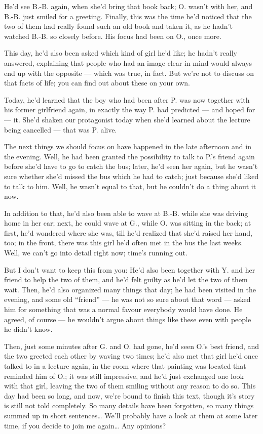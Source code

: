 He'd see B.-B. again, when she'd bring that book back; O. wasn't with her, and B.-B. just smiled for a greeting. Finally, this was the time he'd noticed that the two of them had really found such an old book and taken it, as he hadn't watched B.-B. so closely before. His focus had been on O., once more.

This day, he'd also been asked which kind of girl he'd like; he hadn't really answered, explaining that people who had an image clear in mind would always end up with the opposite --- which was true, in fact.
But we're not to discuss on that facts of life; you can find out about these on your own.

Today, he'd learned that the boy who had been after P. was now together with his former girlfriend again, in exactly the way P. had predicted --- and hoped for --- it. She'd shaken our protagonist today when she'd learned about the lecture being cancelled --- that was P. alive.

The next things we should focus on have happened in the late afternoon and in the evening. Well, he had been granted the possibility to talk to P.'s friend again before she'd have to go to catch the bus; later, he'd seen her again, but he wasn't sure whether she'd missed the bus which he had to catch; just because she'd liked to talk to him. Well, he wasn't equal to that, but he couldn't do a thing about it now.

In addition to that, he'd also been able to wave at B.-B. while she was driving home in her car; next, he could wave at G., while O. was sitting in the back; at first, he'd wondered where she was, till he'd realized that she'd raised her hand, too; in the front, there was this girl he'd often met in the bus the last weeks.
Well, we can't go into detail right now; time's running out.

But I don't want to keep this from you: He'd also been together with Y. and her friend to help the two of them, and he'd felt guilty as he'd let the two of them wait. Then, he'd also organized many things that day; he had been visited in the evening, and some old \enquote{friend} --- he was not so sure about that word --- asked him for something that was a normal favour everybody would have done. He agreed, of course --- he wouldn't argue about things like these even with people he didn't know.

Then, just some minutes after G. and O. had gone, he'd seen O.'s best friend, and the two greeted each other by waving two times; he'd also met that girl he'd once talked to in a lecture again, in the room where that painting was located that reminded him of O.; it was still impressive, and he'd just exchanged one look with that girl, leaving the two of them smiling without any reason to do so. 
This day had been so long, and now, we're bound to finish this text, though it's story is still not told completely. So many details have been forgotten, so many things summed up in short sentences\ldots
We'll probably have a look at them at some later time, if you decide to join me again\ldots
Any opinions?


